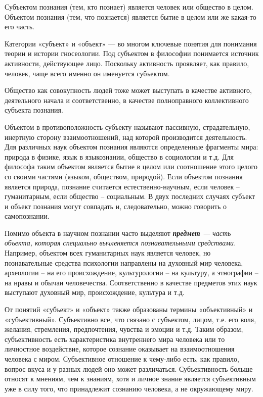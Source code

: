 \documentclass[
]{article}
\begin{document}
Субъектом познания (тем, кто познает) является человек или общество в
целом. Объектом познания (тем, что познается) является бытие в целом или
же какая-то его часть.

Категории «субъект» и «объект» --- во многом ключевые понятия для
понимания теории и истории гносеологии. Под субъектом в философии
понимается источник активности, действующее лицо. Поскольку активность
проявляет, как правило, человек, чаще всего именно он именуется
субъектом.

Общество как совокупность людей тоже может выступать в качестве
активного, деятельного начала и соответственно, в качестве полноправного
коллективного субъекта познания.

Объектом в противоположность субъекту называют пассивную, страдательную,
инертную сторону взаимоотношений, над которой производится деятельность.
Для различных наук объектом познания являются определенные фрагменты
мира: природа в физике, язык в языкознании, общество в социологии и т.д.
Для философа таким объектом является бытие в целом или соотношение этого
целого со своими частями (языком, обществом, природой). Если объектом
познания является природа, познание считается естественно-научным, если
человек -- гуманитарным, если общество -- социальным. В двух последних
случаях субъект и объект познания могут совпадать и, следовательно,
можно говорить о самопознании.

Помимо объекта в научном познании часто выделяют \emph{\textbf{предмет}
--- часть объекта, которая специально вычленяется познавательными
средствами}. Например, объектом всех гуманитарных наук является человек,
но познавательные средства психологии направлены на духовный мир
человека, археологии -- на его происхождение, культурологии -- на
культуру, а этнографии -- на нравы и обычаи человечества. Соответственно
в качестве предметов этих наук выступают духовный мир, происхождение,
культура и т.д.

От понятий «субъект» и «объект» также образованы термины «объективный» и
«субъективный». Субъективно все, что связано с субъектом, лицом, т.е.
его воля, желания, стремления, предпочтения, чувства и эмоции и т.д.
Таким образом, субъективность есть характеристика внутреннего мира
человека или то личностное воздействие, которое сознание оказывает на
взаимоотношения человека с миром. Субъективное отношение к чему-либо
есть, как правило, вопрос вкуса и у разных людей оно может различаться.
Субъективность больше относят к мнениям, чем к знаниям, хотя и личное
знание является субъективным уже в силу того, что принадлежит сознанию
человека, а не окружающему миру.
\end{document}
